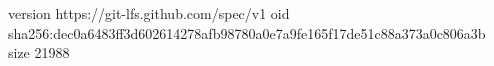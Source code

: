 version https://git-lfs.github.com/spec/v1
oid sha256:dec0a6483ff3d602614278afb98780a0e7a9fe165f17de51c88a373a0c806a3b
size 21988
